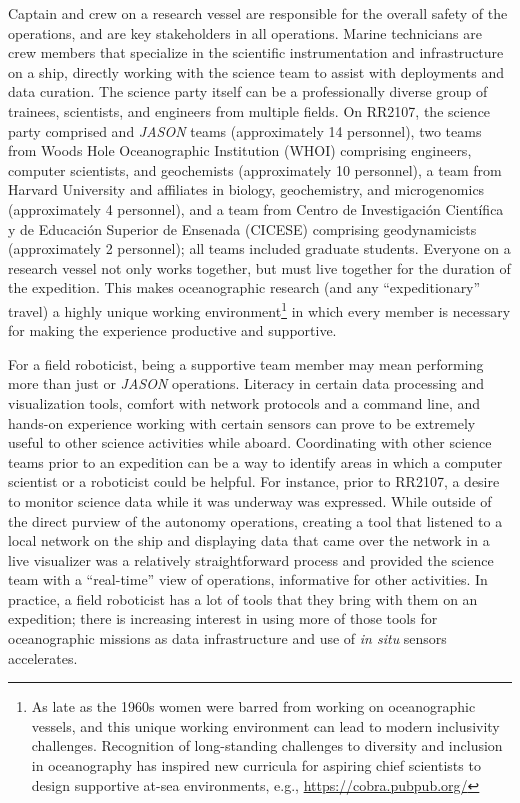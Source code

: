 Captain and crew on a research vessel are responsible for the overall safety of the operations, and are key stakeholders in all operations. Marine technicians are crew members that specialize in the scientific instrumentation and infrastructure on a ship, directly working with the science team to assist with deployments and data curation. The science party itself can be a professionally diverse group of trainees, scientists, and engineers from multiple fields. On RR2107, the science party comprised \Sentry and \emph{JASON} teams (approximately 14 personnel), two teams from Woods Hole Oceanographic Institution (WHOI) comprising engineers, computer scientists, and geochemists (approximately 10 personnel), a team from Harvard University and affiliates in biology, geochemistry, and microgenomics (approximately 4 personnel), and a team from Centro de Investigaci\'on Cient\'ifica y de Educaci\'on Superior de Ensenada (CICESE) comprising geodynamicists (approximately 2 personnel); all teams included graduate students. Everyone on a research vessel not only works together, but must live together for the duration of the expedition. This makes oceanographic research (and any ``expeditionary'' travel) a highly unique working environment\footnote{As late as the 1960s women were barred from working on oceanographic vessels, and this unique working environment can lead to modern inclusivity challenges. Recognition of long-standing challenges to diversity and inclusion in oceanography has inspired new curricula for aspiring chief scientists to design supportive at-sea environments, e.g., \url{https://cobra.pubpub.org/}} in which every member is necessary for making the experience productive and supportive.  

For a field roboticist, being a supportive team member may mean performing more than just \Sentry or \emph{JASON} operations. Literacy in certain data processing and visualization tools, comfort with network protocols and a command line, and hands-on experience working with certain sensors can prove to be extremely useful to other science activities while aboard. Coordinating with other science teams prior to an expedition can be a way to identify areas in which a computer scientist or a roboticist could be helpful. For instance, prior to RR2107, a desire to monitor \Sentry science data while it was underway was expressed. While outside of the direct purview of the autonomy operations, creating a tool that listened to a local network on the ship and displaying data that came over the network in a live visualizer was a relatively straightforward process and provided the science team with a ``real-time'' view of \Sentry operations, informative for other activities. In practice, a field roboticist has a lot of tools that they bring with them on an expedition; there is increasing interest in using more of those tools for oceanographic missions as data infrastructure and use of \emph{in situ} sensors accelerates.  

